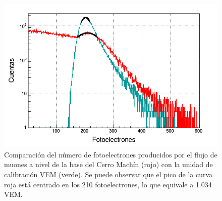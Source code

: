 \documentclass[12pt,oneside,openany,letter]{book}
\begin{document}
\begin{figure}[h]
\centering
\includegraphics[scale=0.4]{images/vem_muflujo.png}
\caption[Comparaci\'on del n\'umero de fotoelectrones producidos por el flujo de muones a nivel de la base del Cerro Mach\'in con la unidad de calibraci\'on VEM]{Comparaci\'on del n\'umero de fotoelectrones producidos por el flujo de muones a nivel de la base del Cerro Mach\'in (rojo) con la unidad de calibraci\'on VEM (verde). Se puede observar que el pico de la curva roja est\'a centrado en los 210 fotoelectrones, lo que equivale a 1.034 VEM.  
\label{vem_muflujo}}
\end{figure}

\end{document}
